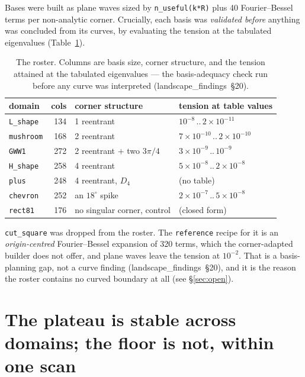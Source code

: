 \documentclass[11pt]{article}
\newcommand{\file}[1]{\texttt{#1}}
\newcommand{\lf}[1]{(landscape\_findings~\S#1)}
\begin{document}
Bases were built as plane waves sized by \verb|n_useful(k*R)| plus 40 Fourier--Bessel terms per
non-analytic corner. Crucially, each basis was \emph{validated before} anything was concluded
from its curves, by evaluating the tension at the tabulated eigenvalues
(Table~\ref{tab:roster}).

\begin{table}[htbp]
\centering
\caption{The roster. Columns are basis size, corner structure, and the tension attained at the
tabulated eigenvalues --- the basis-adequacy check run before any curve was interpreted
\lf{20}.}
\label{tab:roster}
\begin{tabular}{lrll}
\toprule
domain & cols & corner structure & tension at table values \\
\midrule
\file{L\_shape}  & 134 & 1 reentrant                        & $10^{-8}\,..\,2\times10^{-11}$ \\
\file{mushroom}  & 168 & 2 reentrant                        & $7\times10^{-10}\,..\,2\times10^{-10}$ \\
\file{GWW1}      & 272 & 2 reentrant $+$ two $3\pi/4$       & $3\times10^{-9}\,..\,10^{-9}$ \\
\file{H\_shape}  & 258 & 4 reentrant                        & $5\times10^{-8}\,..\,2\times10^{-8}$ \\
\file{plus}      & 248 & 4 reentrant, $D_4$                 & (no table) \\
\file{chevron}   & 252 & an $18^\circ$ spike                & $2\times10^{-7}\,..\,5\times10^{-8}$ \\
\file{rect81}    & 176 & no singular corner, control        & (closed form) \\
\bottomrule
\end{tabular}
\end{table}

\file{cut\_square} was dropped from the roster. The \verb|reference| recipe for it is an
\emph{origin-centred} Fourier--Bessel expansion of 320 terms, which the corner-adapted builder
does not offer, and plane waves leave the tension at $10^{-2}$. That is a basis-planning gap,
not a curve finding \lf{20}, and it is the reason the roster contains no curved boundary at all
(see \S\ref{sec:open}).

\section{The plateau is stable across domains; the floor is not, within one scan}
\label{sec:plateau}
\end{document}
